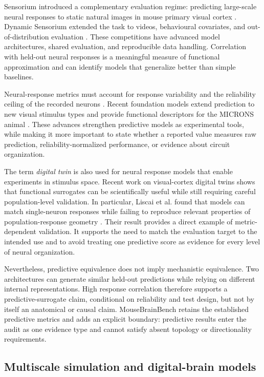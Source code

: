 Sensorium introduced a complementary evaluation regime: predicting large-scale
neural responses to static natural images in mouse primary visual cortex
\citep{willeke2022sensorium}. Dynamic Sensorium extended the task to videos,
behavioural covariates, and out-of-distribution evaluation
\citep{turishcheva2023dynamic,turishcheva2024retrospective}. These competitions
have advanced model architectures, shared evaluation, and reproducible data
handling. Correlation with held-out neural responses is a meaningful measure of
functional approximation and can identify models that generalize better than
simple baselines.

Neural-response metrics must account for response variability and the
reliability ceiling of the recorded neurons \citep{schoppe2016performance}.
Recent foundation models extend prediction to new visual stimulus types and
provide functional descriptors for the MICRONS animal
\citep{wang2025foundation}. These advances strengthen predictive models as
experimental tools, while making it more important to state whether a reported
value measures raw prediction, reliability-normalized performance, or evidence
about circuit organization.

The term \emph{digital twin} is also used for neural response models that enable
experiments in stimulus space. Recent work on visual-cortex digital twins shows
that functional surrogates can be scientifically useful while still requiring
careful population-level validation. In particular, Liscai et al. found that
models can match single-neuron responses while failing to reproduce relevant
properties of
population-response geometry \citep{liscai2025population}. Their result provides
a direct example of metric-dependent validation. It supports the need to match
the evaluation target to the intended use and to avoid treating one predictive
score as evidence for every level of neural organization.

Nevertheless, predictive equivalence does not imply mechanistic equivalence.
Two architectures can generate similar held-out predictions while relying on
different internal representations. High response correlation therefore
supports a predictive-surrogate claim, conditional on reliability and test
design, but not by itself an anatomical or causal claim. MouseBrainBench retains
the established predictive metrics and adds an explicit boundary: predictive
results enter the audit as one evidence type and cannot satisfy absent topology
or directionality requirements.

\subsection{Multiscale simulation and digital-brain models}
\label{subsec:multiscale-simulation}

